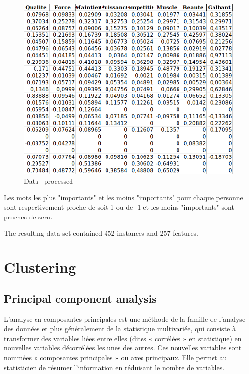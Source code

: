 \documentclass[12pt]{article}
\begin{document}
\begin{figure}[h]
\begin{center}
\includegraphics[scale=0.7]{donnée_nettoyé.png} 
\caption[]{Data \ processed }
\end{center}
\end{figure}


Les mots les plus "importants"  et les moins "importants" pour chaque personne sont respectivement proche de soit 1 ou  de -1 et les moins "importants" sont proches de zero.

 The resulting data set contained 452
instances and 257 features.




\section{Clustering}  %


\subsection{Principal component analysis}
L'analyse en composantes principales est une méthode de la famille de l'analyse des données et plus généralement de la
statistique multivariée, qui consiste à transformer des variables liées entre elles (dites « corrélées » en statistique) en nouvelles variables décorrélées les unes des autres. Ces nouvelles variables sont nommées « composantes principales » ou axes principaux. Elle permet au statisticien de résumer l'information en réduisant le nombre de variables.
\end{document}
